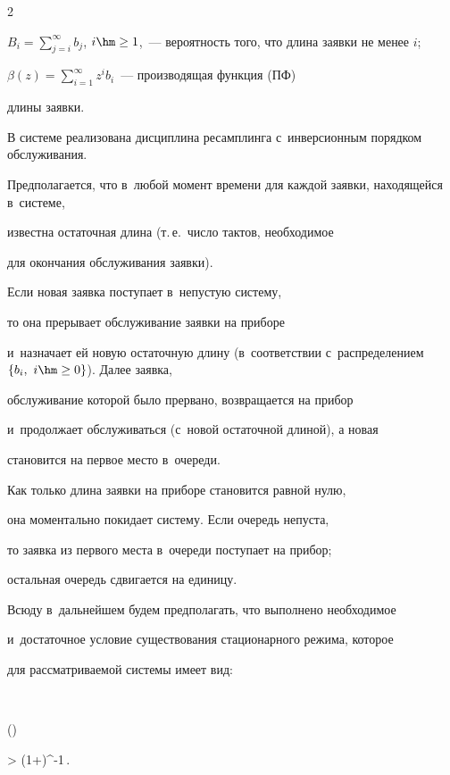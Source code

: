 \begin{multicols}{2}
\begin{description}
\item

$B_i=\sum\nolimits_{j=i}^\infty b_j$, $i \hm\ge 1$,~--- вероятность того, что длина заявки не менее $i$;

\item

$\beta(z)=\sum\nolimits_{i=1}^\infty  z^i b_i$~--- производящая функция (ПФ)

длины заявки.

\end{description}



В системе реализована дисциплина ресамплинга с~инверсионным порядком обслуживания.

Предполагается, что в~любой момент времени для каждой заявки, находящейся в~системе,

известна остаточная длина (т.\,е.\ число тактов, необходимое

для окончания обслуживания заявки).

Если новая заявка поступает в~непустую систему,

то она прерывает обслуживание заявки на приборе 

и~назначает ей новую остаточную длину (в~соответствии с~распределением~$\{b_i, 

\ i\hm\ge 0\}$). Далее заявка,

обслуживание которой было прервано, возвращается на прибор

и~продолжает обслуживаться (с~новой остаточной длиной), а новая

становится на первое место в~очереди.

Как только длина заявки на приборе становится равной нулю,

она моментально покидает систему. Если очередь непуста,

то заявка из первого места в~очереди поступает на прибор;

остальная очередь сдвигается на единицу.



Всюду в~дальнейшем будем предполагать, что выполнено необходимое

и~достаточное условие существования стационарного режима, которое

для рассматриваемой системы имеет вид:

$$

\beta\left(\right)

> \left(1+\right)^{-1}\,.


\end{multicols}
